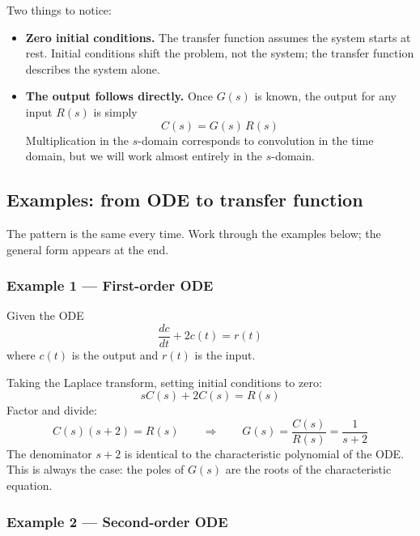 \documentclass[../../book.tex]{subfiles}
\begin{document}
Two things to notice:
\begin{itemize}
  \item \textbf{Zero initial conditions.}  The transfer function assumes the
    system starts at rest.  Initial conditions shift the problem, not the
    system; the transfer function describes the system alone.
  \item \textbf{The output follows directly.}  Once $G(s)$ is known, the
    output for any input $R(s)$ is simply
    \begin{equation}
      C(s) = G(s)\,R(s)
      \label{eq:output_rule}
    \end{equation}
    Multiplication in the $s$-domain corresponds to convolution in the time
    domain, but we will work almost entirely in the $s$-domain.
\end{itemize}

\subsection{Examples: from ODE to transfer function}
\label{sec:tf_examples}

The pattern is the same every time.  Work through the examples below; the
general form appears at the end.

\subsubsection*{Example 1 --- First-order ODE}

Given the ODE
\begin{equation}
  \frac{dc}{dt} + 2c(t) = r(t)
  \label{eq:ex1_ode}
\end{equation}
where $c(t)$ is the output and $r(t)$ is the input.

Taking the Laplace transform, setting initial conditions to zero:
\[
  sC(s) + 2C(s) = R(s)
\]
Factor and divide:
\[
  C(s)(s + 2) = R(s)
  \qquad \Longrightarrow \qquad
  G(s) = \frac{C(s)}{R(s)} = \frac{1}{s+2}
\]
The denominator $s + 2$ is identical to the characteristic polynomial of the
ODE.  This is always the case: the poles of $G(s)$ are the roots of the
characteristic equation.

\subsubsection*{Example 2 --- Second-order ODE}
\end{document}
